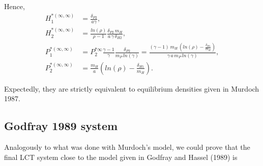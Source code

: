 \documentclass[12pt,a4paper,onecolumn]{article}
\begin{document}
Hence, 
\begin{align}
H_1^{*(\infty,\infty)} &= \frac{\delta_{P2}}{a\gamma}, \nonumber \\
H_2^{*(\infty,\infty)} &=  \frac{ln(\rho)}{\rho-1} \frac{\delta_{P2} \, m_H}{a \, \gamma \, \delta_{H2}}, \nonumber \\
P_1^{*(\infty,\infty)} &= P_2^{* \infty} \frac{\gamma -1}{\gamma} \frac{\delta_{P2}}{m_P \, ln(\gamma)} = \frac{(\gamma-1)\, m_H \, (ln(\rho) - \frac{\delta_{H1}}{m_H})}{\gamma \,  a \,  m_P \,  ln(\gamma)}, \\
P_2^{*(\infty,\infty)} &=\frac{m_H}{a}(ln(\rho) - \frac{\delta_{H1}}{m_H}). \nonumber  
\end{align}


Expectedly, they are strictly equivalent to equilibrium densities given in Murdoch 1987.

\subsection{Godfray 1989 system}

Analogously to what was done with Murdoch's model, we could prove that the final LCT system close to the model given in Godfray and Hassel (1989) is 
\end{document}
